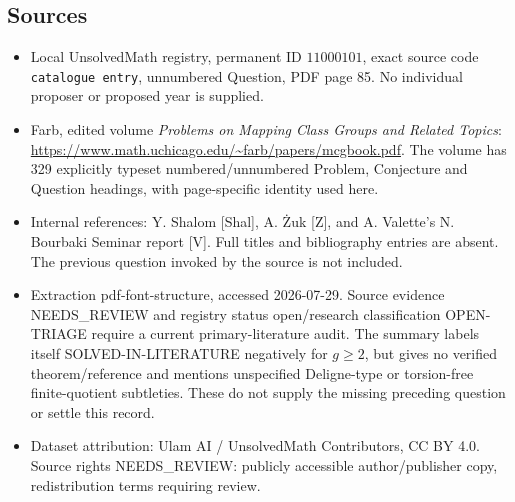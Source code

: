 \documentclass[11pt]{article}
\begin{document}
\subsection{Sources}
\begin{itemize}
\item Local UnsolvedMath registry, permanent ID \(11000101\), exact source code \texttt{catalogue entry}, unnumbered Question, PDF page 85. No individual proposer or proposed year is supplied.
\item Farb, edited volume \emph{Problems on Mapping Class Groups and Related Topics}: \url{https://www.math.uchicago.edu/~farb/papers/mcgbook.pdf}. The volume has 329 explicitly typeset numbered/unnumbered Problem, Conjecture and Question headings, with page-specific identity used here.
\item Internal references: Y. Shalom [Shal], A. Żuk [Z], and A. Valette's N. Bourbaki Seminar report [V]. Full titles and bibliography entries are absent. The previous question invoked by the source is not included.
\item Extraction pdf-font-structure, accessed 2026-07-29. Source evidence NEEDS\_REVIEW and registry status open/research classification OPEN-TRIAGE require a current primary-literature audit. The summary labels itself SOLVED-IN-LITERATURE negatively for \(g\ge2\), but gives no verified theorem/reference and mentions unspecified Deligne-type or torsion-free finite-quotient subtleties. These do not supply the missing preceding question or settle this record.
\item Dataset attribution: Ulam AI / UnsolvedMath Contributors, CC BY 4.0. Source rights NEEDS\_REVIEW: publicly accessible author/publisher copy, redistribution terms requiring review.
\end{itemize}
\end{document}
